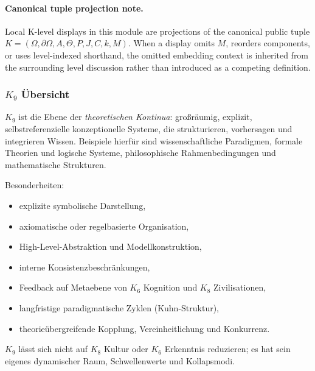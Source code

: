 



\paragraph{Canonical tuple projection note.}
Local K-level displays in this module are projections of the canonical public tuple \(K=(\Omega,\partial\Omega,A,\Theta,P,J,C,k,M)\). When a display omits \(M\), reorders components, or uses level-indexed shorthand, the omitted embedding context is inherited from the surrounding level discussion rather than introduced as a competing definition.

\subsubsection{\texorpdfstring{$K_9$}{K_9} Übersicht}
\label{sec:k9-overview}

$K_9$ ist die Ebene der \emph{theoretischen Kontinua}: großräumig, explizit,
selbstreferenzielle konzeptionelle Systeme, die strukturieren, vorhersagen und integrieren
Wissen. Beispiele hierfür sind wissenschaftliche Paradigmen, formale Theorien und logische
Systeme, philosophische Rahmenbedingungen und mathematische Strukturen.

Besonderheiten:
\begin{itemize}
    \item explizite symbolische Darstellung,
    \item axiomatische oder regelbasierte Organisation,
    \item High-Level-Abstraktion und Modellkonstruktion,
    \item interne Konsistenzbeschränkungen,
    \item Feedback auf Metaebene von $K_6$ Kognition und $K_8$ Zivilisationen,
    \item langfristige paradigmatische Zyklen (Kuhn-Struktur),
    \item theorieübergreifende Kopplung, Vereinheitlichung und Konkurrenz.
\end{itemize}

$K_9$ lässt sich nicht auf $K_8$ Kultur oder $K_6$ Erkenntnis reduzieren; es hat sein eigenes
dynamischer Raum, Schwellenwerte und Kollapsmodi.

